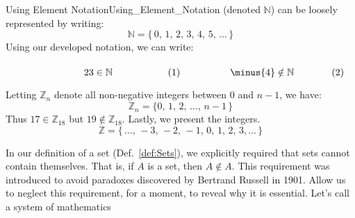 \begin{fexample}{Using Element Notation}{Using_Element_Notation}
        (denoted $\mathbb{N}$) can be loosely represented by writing:
        \begin{equation}
            \label{eqn:Natural_Numbers_Ellipses}%
            \mathbb{N}=\big\{\,0,\,1,\,2,\,3,\,4,\,5,\,\dots\,\big\}
        \end{equation}
        Using our developed notation, we can write:
        \par\hfill\par
        \begin{subequations}
            \begin{minipage}[b]{0.49\textwidth}
                \begin{equation}
                    23\in\mathbb{N}
                \end{equation}
            \end{minipage}
            \hfill
            \begin{minipage}[b]{0.49\textwidth}
                \begin{equation}
                    \minus{4}\notin\mathbb{N}
                \end{equation}
            \end{minipage}
        \end{subequations}
        \par\vspace{2.5ex}
        Letting $\mathbb{Z}_{n}$ denote all non-negative integers between 0 and
        $n-1$, we have:
        \begin{equation}
            \label{eqn:Z_n_Ellipses}%
            \mathbb{Z}_{n}=\big\{0,\,1,\,2,\,\dots,\,n-1\,\big\}
        \end{equation}
        Thus $17\in\mathbb{Z}_{18}$ but $19\notin\mathbb{Z}_{18}$. Lastly, we
        present the integers.
        \begin{equation}
            \label{eqn:Integers_Ellipses}%
            \mathbb{Z}=\big\{\,\dots,\,\minus{3},\,\minus{2},\,\minus{1},
                             \,0,\,1,\,2,\,3,\dots\,\big\}
        \end{equation}
    \end{fexample}
    In our definition of a set (Def.~\ref{def:Sets}), we explicitly required
    that sets cannot contain themselves. That is, if $A$ is a set, then
    $A\notin{A}$. This requirement was introduced to avoid paradoxes discovered
    by Bertrand Russell in 1901. Allow us to neglect this requirement, for a
    moment, to reveal why it is essential. Let's call a system of mathematics
